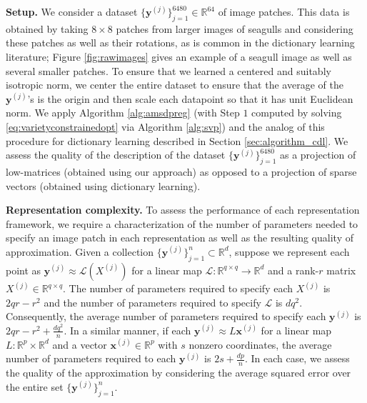 \documentclass[11pt,letterpaper]{article}
\newcommand{\R}{\mathbb{R}}
\newcommand{\bx}{\mathbf{x}}
\newcommand{\by}{\mathbf{y}}
\renewcommand{\L}{\mathcal{L}}
\begin{document}
\textbf{Setup.} We consider a dataset $\{ \by^{(j)} \}_{j=1}^{6480} \in \R^{64}$ of image patches.  This data is obtained by taking $8 \times 8$ patches from larger images of seagulls and considering these patches as well as their rotations, as is common in the dictionary learning literature; Figure \ref{fig:rawimages} gives an example of a seagull image as well as several smaller patches.  To ensure that we learned a centered and suitably isotropic norm, we center the entire dataset to ensure that the average of the $\by^{(j)}$'s is the origin and then scale each datapoint so that it has unit Euclidean norm.  We apply Algorithm \ref{alg:amsdpreg} (with Step $1$ computed by solving \eqref{eq:varietyconstrainedopt} via Algorithm \ref{alg:svp}) and the analog of this procedure for dictionary learning described in Section \ref{sec:algorithm_cdl}.  We assess the quality of the description of the dataset $\{ \by^{(j)} \}_{j=1}^{6480}$ as a projection of low-matrices (obtained using our approach) as opposed to a projection of sparse vectors (obtained using dictionary learning).


\textbf{Representation complexity.} To assess the performance of each representation framework, we require a characterization of the number of parameters needed to specify an image patch in each representation as well as the resulting quality of approximation.  Given a collection $\{\by^{(j)}\}_{j=1}^n \subset \R^d$, suppose we represent each point as $\by^{(j)} \approx \L (X^{(j)})$ for a linear map $\L : \R^{q \times q} \rightarrow \R^d$ and a rank-$r$ matrix $X^{(j)} \in \R^{q \times q}$.  The number of parameters required to specify each $X^{(j)}$ is $2qr - r^2$ and the number of parameters required to specify $\L$ is $d q^2$.  Consequently, the average number of parameters required to specify each $\by^{(j)}$ is $2qr - r^2 + \frac{dq^2}{n}$.  In a similar manner, if each $\by^{(j)} \approx L \bx^{(j)}$ for a linear map $L : \R^p \times \R^d$ and a vector $\bx^{(j)} \in \R^p$ with $s$ nonzero coordinates, the average number of parameters required to each $\by^{(j)}$ is $2s + \frac{dp}{n}$.  In each case, we assess the quality of the approximation by considering the average squared error over the entire set $\{\by^{(j)}\}_{j=1}^n$.
\end{document}
